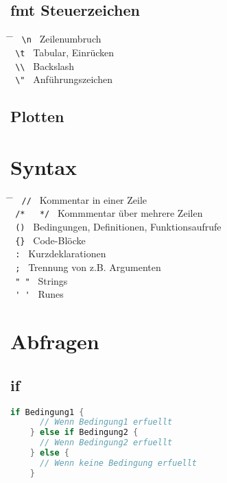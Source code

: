 \documentclass[twoside,a4paper,12pt]{article}
\begin{document}
\subsection{fmt Steuerzeichen}
\begin{tabbing}
  \hspace{2mm} \= \hspace{70mm} \= \kill
  \> \verb| \n | \> Zeilenumbruch \\ 
  \> \verb| \t | \> Tabular, Einrücken \\ 
  \> \verb| \\ | \> Backslash \\ 
  \> \verb| \" | \> Anführungszeichen \\ 
\end{tabbing}
\subsection{Plotten}

\section{Syntax}
\begin{tabbing}
  \hspace{2mm} \= \hspace{70mm} \= \kill
  \> \verb| // | \> Kommentar in einer Zeile \\
  \> \verb| /*   */ | \> Kommmentar über mehrere Zeilen \\ 
  \> \verb| () | \> Bedingungen, Definitionen, Funktionsaufrufe \\ 
  \> \verb| {} | \> Code-Blöcke \\ 
  \> \verb| : | \> Kurzdeklarationen \\ 
  \> \verb| ; | \> Trennung von z.B. Argumenten \\ 
  \> \verb| " " | \> Strings \\ 
  \> \verb| ' ' | \> Runes \\ 
\end{tabbing}

\section{Abfragen}
\subsection{if}
\begin{center}
  \begin{minipage}{1.0\textwidth}
    \begin{lstlisting}[language=Go]
    if Bedingung1 {
      // Wenn Bedingung1 erfuellt
    } else if Bedingung2 {
      // Wenn Bedingung2 erfuellt
    } else {
      // Wenn keine Bedingung erfuellt
    }
    \end{lstlisting}
  \end{minipage}
\end{center}
\end{document}
